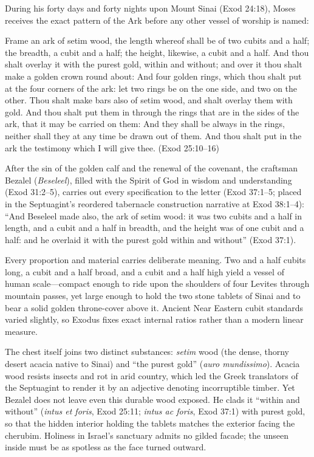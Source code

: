 During his forty days and forty nights upon Mount Sinai (Exod 24:18), Moses receives the exact pattern of the Ark before any other vessel of worship is named:

\begin{scriptureblock}
Frame an ark of setim wood, the length whereof shall be of two cubits and a half; the breadth, a cubit and a half; the height, likewise, a cubit and a half. And thou shalt overlay it with the purest gold, within and without; and over it thou shalt make a golden crown round about: And four golden rings, which thou shalt put at the four corners of the ark: let two rings be on the one side, and two on the other. Thou shalt make bars also of setim wood, and shalt overlay them with gold. And thou shalt put them in through the rings that are in the sides of the ark, that it may be carried on them: And they shall be always in the rings, neither shall they at any time be drawn out of them. And thou shalt put in the ark the testimony which I will give thee. \textnormal{(Exod 25:10--16)}
\end{scriptureblock}

After the sin of the golden calf and the renewal of the covenant, the craftsman Bezalel (\textit{Beseleel}), filled with the Spirit of God in wisdom and understanding (Exod 31:2--5), carries out every specification to the letter (Exod 37:1--5; placed in the Septuagint's reordered tabernacle construction narrative at Exod 38:1--4): ``And Beseleel made also, the ark of setim wood: it was two cubits and a half in length, and a cubit and a half in breadth, and the height was of one cubit and a half: and he overlaid it with the purest gold within and without'' (Exod 37:1).

Every proportion and material carries deliberate meaning. Two and a half cubits long, a cubit and a half broad, and a cubit and a half high yield a vessel of human scale---compact enough to ride upon the shoulders of four Levites through mountain passes, yet large enough to hold the two stone tablets of Sinai and to bear a solid golden throne-cover above it. Ancient Near Eastern cubit standards varied slightly, so Exodus fixes exact internal ratios rather than a modern linear measure.

The chest itself joins two distinct substances: \textit{setim} wood (the dense, thorny desert acacia native to Sinai) and ``the purest gold'' (\textit{auro mundissimo}). Acacia wood resists insects and rot in arid country, which led the Greek translators of the Septuagint to render it by an adjective denoting incorruptible timber. Yet Bezalel does not leave even this durable wood exposed. He clads it ``within and without'' (\textit{intus et foris}, Exod 25:11; \textit{intus ac foris}, Exod 37:1) with purest gold, so that the hidden interior holding the tablets matches the exterior facing the cherubim. Holiness in Israel's sanctuary admits no gilded facade; the unseen inside must be as spotless as the face turned outward.

